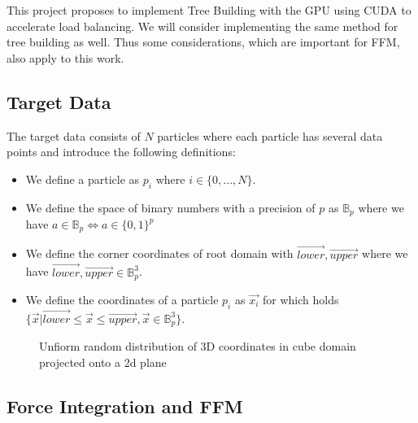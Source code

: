 \documentclass[]{article}
\begin{document}
This project proposes to implement Tree Building with the GPU using CUDA to accelerate load balancing. We will consider implementing the same method for tree building as well. Thus some considerations, which are important for FFM, also apply to this work.

\subsection{Target Data}\label{section:target-data}


The target data consists of $N$ particles where each particle has several data points and introduce the following definitions:

\begin{itemize}
	\item We define a particle as $p_i$  where $i \in \{0,...,N\}$. 
	\item We define the space of binary numbers with a precision of $p$ as $\mathbb{B}_p$ where we have $a \in \mathbb{B}_p \Leftrightarrow a \in \{0,1\}^{p}$
	\item We define the corner coordinates of root domain with $\vec{lower}, \vec{upper}$ where we have $\vec{lower}, \vec{upper} \in \mathbb{B}_p^3$. 
	\item We define the coordinates of a particle $p_i$ as $\vec{x_i}$ for which holds $\{\vec{x} | \vec{lower} \leq \vec{x} \leq \vec{upper}, \vec{x} \in \mathbb{B}_p^3 \}$.

\end{itemize}

\begin{figure}[H]
	\begin{center}
	\end{center}
\caption{Unfiorm random distribution of 3D coordinates in cube domain projected onto a 2d plane}
\end{figure}


\subsection{Force Integration and FFM}\label{section:force-integration}
\end{document}

